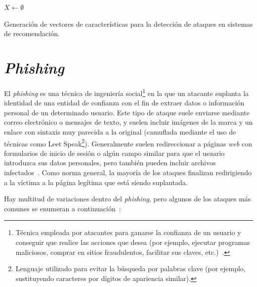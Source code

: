 \begin{algorithm}
	\BlankLine
	$X \leftarrow \emptyset$\\
	\caption{Generación de vectores de características para la detección de ataques en sistemas de recomendación.}
	\label{alg:window_feature_extraction}
\end{algorithm}


\section{\textit{Phishing}}

El \textit{phishing} es una técnica de ingeniería social\footnote{Técnica empleada por atacantes para ganarse la confianza de un usuario y conseguir que realice las acciones que desea (por ejemplo, ejecutar programas maliciosos, comprar en sitios fraudulentos, facilitar sus claves, etc.)~\cite{ingenieriaSocialINCIBE}.} en la que un atacante suplanta la identidad de una entidad de confianza con el fin de extraer datos o información personal de un determinado usuario. Este tipo de ataque suele enviarse mediante correo electrónico o mensajes de texto, y suelen incluir imágenes de la marca y un enlace con sintaxis muy parecida a la original (camuflada mediante el uso de técnicas como Leet Speak\footnote{Lenguaje utilizado para evitar la búsqueda por palabras clave (por ejemplo, sustituyendo caracteres por dígitos de apariencia similar).}). Generalmente suelen redireccionar a páginas \textit{web} con formularios de inicio de sesión o algún campo similar para que el usuario introduzca sus datos personales, pero también pueden incluir archivos infectados~\cite{phishingBBVA}. Como norma general, la mayoría de los ataques finalizan redirigiendo a la víctima a la página legítima que está siendo suplantada.

Hay multitud de variaciones dentro del \textit{phishing}, pero algunos de los ataques más comunes se enumeran a continuación~\cite{phishingKeeperSecurity}: 

